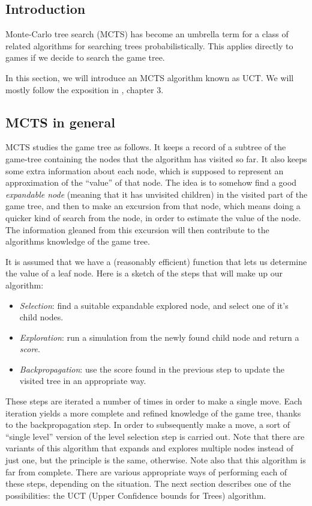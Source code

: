 \subsection {Introduction}

Monte-Carlo tree search (MCTS) has become an umbrella term for a class of related algorithms for searching trees probabilistically.
This applies directly to games if we decide to search the game tree.

In this section, we will introduce an MCTS algorithm known as UCT.
We will mostly follow the exposition in \citep{mcts_survey12}, chapter 3.

\subsection {MCTS in general}

MCTS studies the game tree as follows.
It keeps a record of a subtree of the game-tree containing the nodes that the algorithm has visited so far.
It also keeps some extra information about each node, which is supposed to represent an approximation of the ``value'' of that node.
The idea is to somehow find a good \emph{expandable node} (meaning that it has unvisited children) in the visited part of the game tree, and then to make an excursion from that node, which means doing a quicker kind of search from the node, in order to estimate the value of the node. The information gleaned from this excursion will then contribute to the algorithms knowledge of the game tree.

It is assumed that we have a (reasonably efficient) function that lets us determine the value of a leaf node.
Here is a sketch of the steps that will make up our algorithm:

\begin{itemize}
\item \emph{Selection}: find a suitable expandable explored node, and select one of it's child nodes.
\item \emph{Exploration}: run a simulation from the newly found child node and return a \emph{score}.
\item \emph{Backpropagation}: use the score found in the previous step to update the visited tree in an appropriate way.
\end{itemize}
These steps are iterated a number of times in order to make a single move. Each iteration yields a more complete and refined knowledge of the game tree, thanks to the backpropagation step. In order to subsequently make a move, a sort of ``single level'' version of the level selection step is carried out.
Note that there are variants of this algorithm that expands and explores multiple nodes instead of just one, but the principle is the same, otherwise.
Note also that this algorithm is far from complete. There are various appropriate ways of performing each of these steps, depending on the situation.
The next section describes one of the possibilities: the UCT (Upper Confidence bounds for Trees) algorithm.

